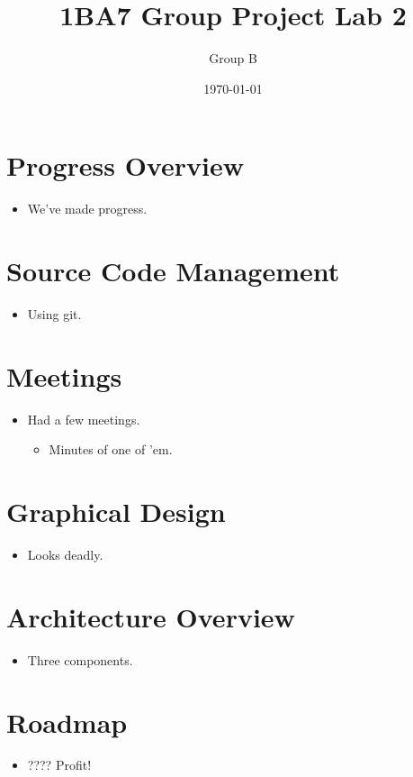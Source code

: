 \documentclass[titlepage,a4paper]{article}
\begin{document}
\title{1BA7 Group Project Lab 2}
\author{Group B}
\date{\today}
\maketitle
\newcommand{\mono}[1]{\texttt{#1}}
\newcommand{\code}[1]{\texttt{#1}}

\section{Progress Overview}
\begin{itemize}
\item We've made progress.
\end{itemize}

\section{Source Code Management}
\begin{itemize}
\item Using git.
\end{itemize}

\section{Meetings}
\begin{itemize}
\item Had a few meetings.\begin{itemize}
	\item Minutes of one of 'em.
\end{itemize}
\end{itemize}

\section{Graphical Design}
\begin{itemize}
\item Looks deadly.
\end{itemize}

\section{Architecture Overview}
\begin{itemize}
\item Three components.
\end{itemize}

\section{Roadmap}
\begin{itemize}
\item ???? Profit!
\end{itemize}
\end{document}
